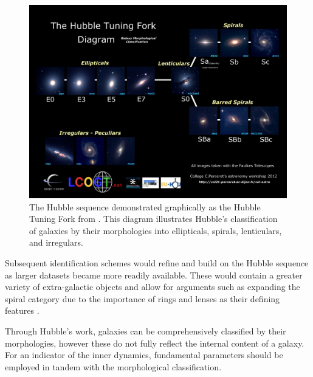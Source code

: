 \documentclass[12pt, twocolumn]{revtex4-1}    %
\begin{document}
\begin{figure}
\includegraphics[width=\textwidth]{introduction/hubble-tuning-fork-diagram}
\caption{The Hubble sequence demonstrated graphically as the Hubble Tuning Fork from \cite{hubble_tuning_fork} . This diagram illustrates Hubble's classification of galaxies by their morphologies into ellipticals, spirals, lenticulars, and irregulars.}
\label{fig:hubble_tuning_fork}
\end{figure}


Subsequent identification schemes would refine and build on the Hubble sequence as larger datasets became more readily available. These would contain a greater variety of extra-galactic objects and allow for arguments such as expanding the spiral category due to the importance of rings and lenses as their defining features \citep{1959HDP....53..275D}. 

Through Hubble's work, galaxies can be comprehensively classified by their morphologies, however these do not fully reflect the internal content of a galaxy. For an indicator of the inner dynamics, fundamental parameters should be employed in tandem with the morphological classification. 
\end{document}
